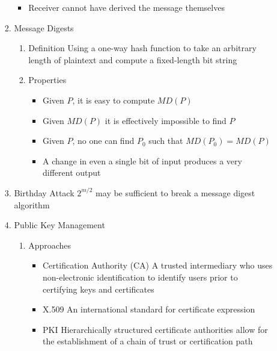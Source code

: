 \documentclass[a4paper,10pt]{article}
\begin{document}
\begin{enumerate}
\begin{enumerate}
\begin{enumerate}
\begin{itemize}
              \item Receiver cannot have derived the message themselves
            \end{itemize}
          \item Message Digests
            \begin{enumerate}
              \item Definition
                \newline Using a one-way hash function to take an arbitrary length of plaintext and compute a fixed-length bit string
              \item Properties
                \begin{itemize}
                  \item Given $P$, it is easy to compute $\textit{MD}(P)$
                  \item Given $\textit{MD}(P)$ it is effectively impossible to find $P$
                  \item Given $P$, no one can find $P_0$ such that $\textit{MD}(P_0)=\textit{MD}(P)$
                  \item A change in even a single bit of input produces a very different output
                \end{itemize}
            \end{enumerate}
          \item Birthday Attack
            \newline $ 2^{m/2} $ may be sufficient to break a message digest algorithm
          \item Public Key Management
            \begin{enumerate}
              \item Approaches
                \begin{itemize}
                  \item Certification Authority (CA)
                    \newline A trusted intermediary who uses non-electronic identification to identify users prior to certifying keys and certificates
                  \item X.509
                    \newline An international standard for certificate expression
                  \item PKI
                    \newline Hierarchically structured certificate authorities allow for the establishment of a chain of trust or certification path
                \end{itemize}

\end{enumerate}
\end{enumerate}
\end{enumerate}
\end{enumerate}
\end{document}
